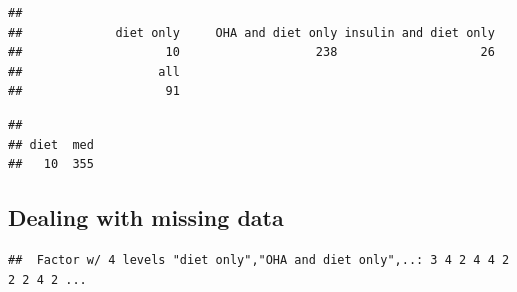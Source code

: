 \documentclass[]{book}
\newenvironment{Shaded}{\begin{snugshade}}{\end{snugshade}}
\newcommand{\KeywordTok}[1]{\textcolor[rgb]{0.13,0.29,0.53}{\textbf{#1}}}
\newcommand{\StringTok}[1]{\textcolor[rgb]{0.31,0.60,0.02}{#1}}
\newcommand{\OperatorTok}[1]{\textcolor[rgb]{0.81,0.36,0.00}{\textbf{#1}}}
\newcommand{\NormalTok}[1]{#1}
\theoremstyle{definition}
\theoremstyle{definition}
\theoremstyle{remark}
\begin{document}
\begin{verbatim}
## 
##             diet only     OHA and diet only insulin and diet only 
##                    10                   238                    26 
##                   all 
##                    91
\end{verbatim}

\begin{Shaded}
\end{Shaded}

\begin{verbatim}
## 
## diet  med 
##   10  355
\end{verbatim}

\subsection{Dealing with missing data}\label{dealing-with-missing-data}

\begin{Shaded}
\end{Shaded}

\begin{verbatim}
##  Factor w/ 4 levels "diet only","OHA and diet only",..: 3 4 2 4 4 2 2 2 4 2 ...
\end{verbatim}

\begin{Shaded}
\end{Shaded}
\end{document}
